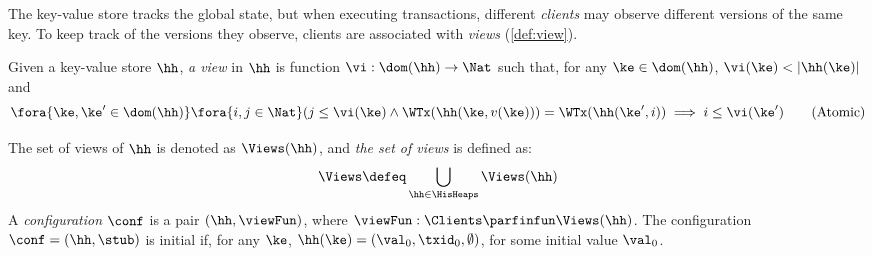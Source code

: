The key-value store tracks the global state, 
but when executing transactions, different \emph{clients} may observe 
different versions of the same key. To keep track of 
the versions they observe, clients are associated with \emph{views} (\cref{def:view}). 

\begin{definition}
\label{def:view}
\label{def:cuts}
\label{def:views}
\label{def:configuration}
Given a key-value store $\hh$, \emph{a view} in $\hh$ is function  
$\vi: \dom(\hh) \to \Nat$ such that, for any $\ke \in \dom(\hh)$, 
$\vi(\ke) < \lvert \hh(\ke) \rvert$ and 
\begin{equation}
\label{eq:view.atomic}
\fora{ \ke,\ke' \in \dom(\hh)} \fora{ i,j \in \Nat} (j \leq \vi(\ke) \wedge 
\WTx(\hh(\ke, v(\ke))) = \WTx(\hh(\ke', i)) \implies i \leq \vi(\ke')
\tag{Atomic}
\end{equation}

The set of views of $\hh$ is denoted 
as $\Views(\hh)$, and \emph{the set of views} is defined as:
\[
\Views \defeq \bigcup_{\hh \in \HisHeaps} \Views(\hh)
\]
A \emph{configuration} $\conf$ is a pair $(\hh, \viewFun)$, where $\viewFun: 
\Clients \parfinfun \Views(\hh)$. The configuration $\conf = (\hh, \stub)$ is 
initial if, for any $\ke$, $\hh(\ke) = (\val_0, \txid_0, \emptyset)$, for some 
initial value $\val_0$. 
\end{definition}
